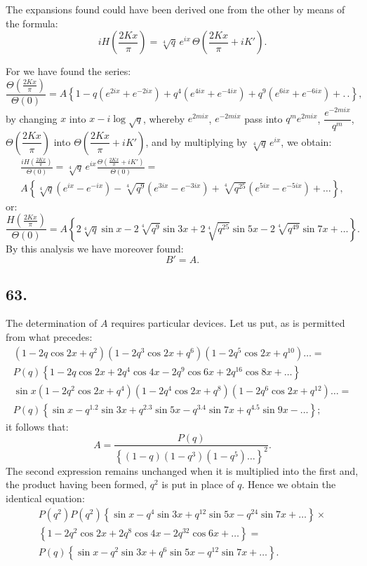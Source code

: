 \documentclass{article}
\begin{document}
The expansions found could have been derived one from the other by means of the formula:
\[
iH\left(\frac{2Kx}{\pi}\right)=\sqrt[4]{q}\,e^{ix}\,\Theta\left(\frac{2Kx}{\pi}+iK'\right).
\]

For we have found the series:
\[
\frac{\Theta\left(\frac{2Kx}{\pi}\right)}{\Theta(0)}=A\left\{1-q(e^{2ix}+e^{-2ix})+q^{4}(e^{4ix}+e^{-4ix})+q^{9}(e^{6ix}+e^{-6ix})+.\,.\right\},
\]
by changing $x$ into $x-i\log\sqrt{q}$, whereby $e^{2mix}$, $e^{-2mix}$ pass into $q^{m}e^{2mix}$, $\dfrac{e^{-2mix}}{q^{m}}$, $\Theta\left(\dfrac{2Kx}{\pi}\right)$ into $\Theta\left(\dfrac{2Kx}{\pi}+iK'\right)$, and by multiplying by $\sqrt[4]{q}\,e^{ix}$, we obtain:
\[
\begin{gathered}
\frac{iH\left(\frac{2Kx}{\pi}\right)}{\Theta(0)}=\sqrt[4]{q}\,e^{ix}\frac{\Theta\left(\frac{2Kx}{\pi}+iK'\right)}{\Theta(0)}=\\[1.5ex]
A\left\{\sqrt[4]{q}(e^{ix}-e^{-ix})-\sqrt[4]{q^{9}}(e^{3ix}-e^{-3ix})+\sqrt[4]{q^{25}}(e^{5ix}-e^{-5ix})+\ldots\right\},
\end{gathered}
\]
or:
\[
\frac{H\left(\frac{2Kx}{\pi}\right)}{\Theta(0)}=A\left\{2\sqrt[4]{q}\sin x-2\sqrt[4]{q^{9}}\sin 3x+2\sqrt[4]{q^{25}}\sin 5x-2\sqrt[4]{q^{49}}\sin 7x+\ldots\right\}.
\]
By this analysis we have moreover found:
\[
B'=A.
\]

\subsection*{63.}

The determination of $A$ requires particular devices. Let us put, as is permitted from what precedes:
\[
\begin{gathered}
(1-2q\cos 2x+q^{2})(1-2q^{3}\cos 2x+q^{6})(1-2q^{5}\cos 2x+q^{10})\ldots=\\[1ex]
P(q)\left\{1-2q\cos 2x+2q^{4}\cos 4x-2q^{9}\cos 6x+2q^{16}\cos 8x+\ldots\right\}\\[1ex]
\sin x(1-2q^{2}\cos 2x+q^{4})(1-2q^{4}\cos 2x+q^{8})(1-2q^{6}\cos 2x+q^{12})\ldots=\\[1ex]
P(q)\left\{\sin x-q^{1.2}\sin 3x+q^{2.3}\sin 5x-q^{3.4}\sin 7x+q^{4.5}\sin 9x-\ldots\right\};
\end{gathered}
\]
it follows that:
\[
A=\frac{P(q)}{\left\{(1-q)(1-q^{3})(1-q^{5})\ldots\right\}^{2}}.
\]
The second expression remains unchanged when it is multiplied into the first and, the product having been formed, $q^{2}$ is put in place of $q$. Hence we obtain the identical equation:
\[
\begin{gathered}
P(q^{2})P(q^{2})\left\{\sin x-q^{4}\sin 3x+q^{12}\sin 5x-q^{24}\sin 7x+\ldots\right\}\times\\[1ex]
\left\{1-2q^{2}\cos 2x+2q^{8}\cos 4x-2q^{32}\cos 6x+\ldots\right\}=\\[1ex]
P(q)\left\{\sin x-q^{2}\sin 3x+q^{6}\sin 5x-q^{12}\sin 7x+\ldots\right\}.
\end{gathered}
\]
\end{document}

